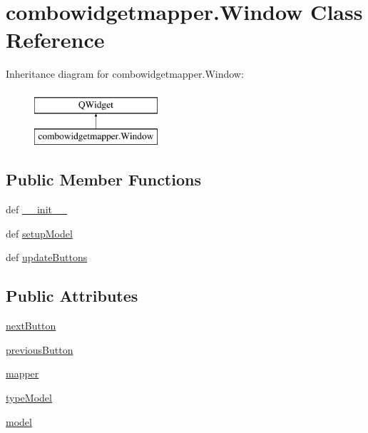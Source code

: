 \hypertarget{classcombowidgetmapper_1_1Window}{}\section{combowidgetmapper.\+Window Class Reference}
\label{classcombowidgetmapper_1_1Window}
Inheritance diagram for combowidgetmapper.\+Window\+:\begin{figure}[H]
\begin{center}
\leavevmode
\includegraphics[height=2.000000cm]{classcombowidgetmapper_1_1Window}
\end{center}
\end{figure}
\subsection*{Public Member Functions}
\begin{DoxyCompactItemize}
\item 
def \hyperlink{classcombowidgetmapper_1_1Window_a6a99c0995b9d7407398d123bc8b3dd14}{\+\_\+\+\_\+init\+\_\+\+\_\+}
\item 
def \hyperlink{classcombowidgetmapper_1_1Window_abc3482e19d59af4826afdf6379953be7}{setup\+Model}
\item 
def \hyperlink{classcombowidgetmapper_1_1Window_aacc9a58128949fc01eea97a843d58186}{update\+Buttons}
\end{DoxyCompactItemize}
\subsection*{Public Attributes}
\begin{DoxyCompactItemize}
\item 
\hyperlink{classcombowidgetmapper_1_1Window_a02518928e5bca419e488233b8b495177}{next\+Button}
\item 
\hyperlink{classcombowidgetmapper_1_1Window_ae5328fba71c3c2b25a01a1cb935bedb4}{previous\+Button}
\item 
\hyperlink{classcombowidgetmapper_1_1Window_aa1e06c201084c7d17c7368f1d5d7681b}{mapper}
\item 
\hyperlink{classcombowidgetmapper_1_1Window_a0963133d54491939e188fe51bbcefd3a}{type\+Model}
\item 
\hyperlink{classcombowidgetmapper_1_1Window_aabc365f21c018fdcc8656e498053578e}{model}
\end{DoxyCompactItemize}


